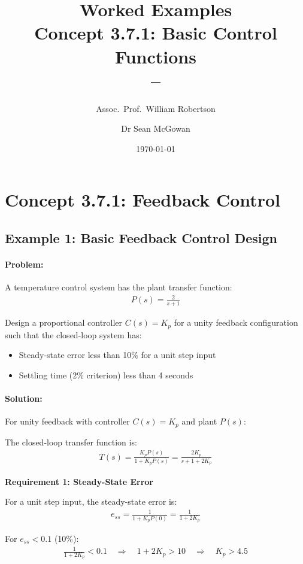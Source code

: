 \documentclass[11pt,a4paper]{article}
\title{\textbf{Worked Examples}\\[0.5em]
\large Concept 3.7.1: Basic Control Functions\\[0.3em]
\normalsize \coursesubtitle{} -- \coursetitle}
\author{Assoc.\ Prof.\ William Robertson \and Dr Sean McGowan}
\date{\today}
\begin{document}
\maketitle
\tableofcontents
\newpage

\section{Concept 3.7.1: Feedback Control}

\subsection{Example 1: Basic Feedback Control Design}

\paragraph{Problem:} A temperature control system has the plant transfer function:
\begin{align}
  P(s) = \frac{2}{s+1}
\end{align}

Design a proportional controller $C(s) = K_p$ for a unity feedback configuration such that the closed-loop system has:
\begin{itemize}
  \item Steady-state error less than 10\% for a unit step input
  \item Settling time (2\% criterion) less than 4 seconds
\end{itemize}

\paragraph{Solution:}

For unity feedback with controller $C(s) = K_p$ and plant $P(s)$:

The closed-loop transfer function is:
\begin{align}
  T(s) = \frac{K_pP(s)}{1 + K_pP(s)} = \frac{2K_p}{s + 1 + 2K_p}
\end{align}

\textbf{Requirement 1: Steady-State Error}

For a unit step input, the steady-state error is:
\begin{align}
  e_{ss} = \frac{1}{1 + K_pP(0)} = \frac{1}{1 + 2K_p}
\end{align}

For $e_{ss} < 0.1$ (10\%):
\begin{align}
  \frac{1}{1 + 2K_p} < 0.1 \quad \Rightarrow \quad 1 + 2K_p > 10 \quad \Rightarrow \quad K_p > 4.5
\end{align}
\end{document}
